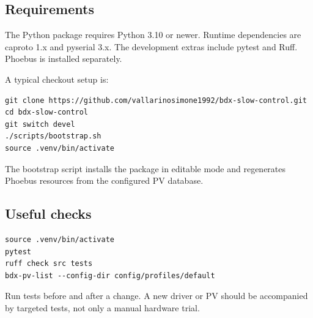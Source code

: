 \subsection{Requirements}

The Python package requires Python 3.10 or newer. Runtime dependencies are caproto 1.x and pyserial 3.x. The development extras include pytest and Ruff. Phoebus is installed separately.

A typical checkout setup is:

\begin{lstlisting}[style=shell]
git clone https://github.com/vallarinosimone1992/bdx-slow-control.git
cd bdx-slow-control
git switch devel
./scripts/bootstrap.sh
source .venv/bin/activate
\end{lstlisting}

The bootstrap script installs the package in editable mode and regenerates Phoebus resources from the configured PV database.

\subsection{Useful checks}

\begin{lstlisting}[style=shell]
source .venv/bin/activate
pytest
ruff check src tests
bdx-pv-list --config-dir config/profiles/default
\end{lstlisting}

Run tests before and after a change. A new driver or PV should be accompanied by targeted tests, not only a manual hardware trial.
